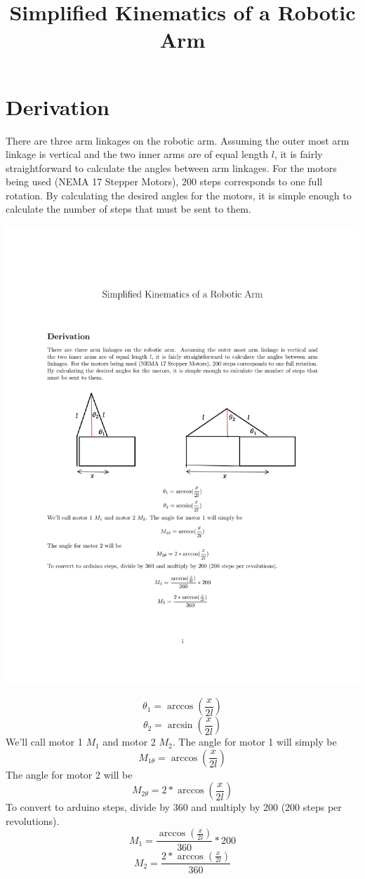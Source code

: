 \documentclass{article}
\begin{document}
\title{Simplified Kinematics of a Robotic Arm}
\author{}
\date{}
\maketitle

\section*{Derivation}
There are three arm linkages on the robotic arm. Assuming the outer most arm linkage is vertical and the two inner arms are of equal length $l$, it is fairly straightforward to calculate the angles between arm linkages. For the motors being used (NEMA 17 Stepper Motors), 200 steps corresponds to one full rotation. By calculating the desired angles for the motors, it is simple enough to calculate the number of steps that must be sent to them. 
\begin{center} \includegraphics[scale=.8]{kinematics}  \end{center}
$$ \theta_1 = \arccos(\frac{x}{2l}) $$
$$ \theta_2 = \arcsin(\frac{x}{2l}) $$
We'll call motor 1 $M_1$ and motor 2 $M_2$. The angle for motor 1 will simply be 
$$ M_{1\theta} = \arccos(\frac{x}{2l}) $$
The angle for motor 2 will be 
$$ M_{2\theta} = 2*\arccos(\frac{x}{2l}) $$
To convert to arduino steps, divide by 360 and multiply by 200 (200 steps per revolutions). 
$$ M_{1} = \frac{\arccos(\frac{x}{2l})}{360}*200 $$
$$ M_{2} = \frac{2*\arccos(\frac{x}{2l})}{360} $$
\end{document}
